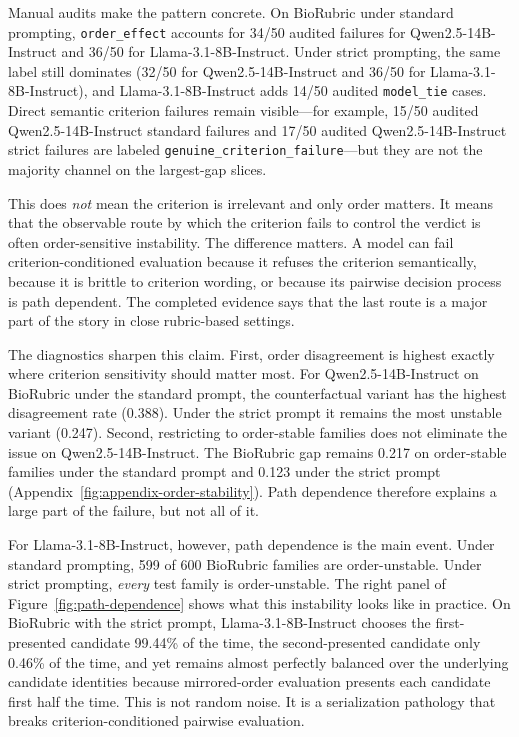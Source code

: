 \documentclass[11pt]{article}
\newcommand{\qwen}{Qwen2.5-14B-Instruct\xspace}
\newcommand{\llama}{Llama-3.1-8B-Instruct\xspace}
\newcommand{\biorubric}{BioRubric\xspace}
\begin{document}
Manual audits make the pattern concrete. On \biorubric under standard prompting, \texttt{order\_effect} accounts for 34/50 audited failures for \qwen and 36/50 for \llama. Under strict prompting, the same label still dominates (32/50 for \qwen and 36/50 for \llama), and \llama adds 14/50 audited \texttt{model\_tie} cases. Direct semantic criterion failures remain visible---for example, 15/50 audited \qwen standard failures and 17/50 audited \qwen strict failures are labeled \texttt{genuine\_criterion\_failure}---but they are not the majority channel on the largest-gap slices.

This does \emph{not} mean the criterion is irrelevant and only order matters. It means that the observable route by which the criterion fails to control the verdict is often order-sensitive instability. The difference matters. A model can fail criterion-conditioned evaluation because it refuses the criterion semantically, because it is brittle to criterion wording, or because its pairwise decision process is path dependent. The completed evidence says that the last route is a major part of the story in close rubric-based settings.

The diagnostics sharpen this claim. First, order disagreement is highest exactly where criterion sensitivity should matter most. For \qwen on \biorubric under the standard prompt, the counterfactual variant has the highest disagreement rate (0.388). Under the strict prompt it remains the most unstable variant (0.247). Second, restricting to order-stable families does not eliminate the issue on \qwen. The \biorubric gap remains 0.217 on order-stable families under the standard prompt and 0.123 under the strict prompt (Appendix~\ref{fig:appendix-order-stability}). Path dependence therefore explains a large part of the failure, but not all of it.

For \llama, however, path dependence is the main event. Under standard prompting, 599 of 600 \biorubric families are order-unstable. Under strict prompting, \emph{every} test family is order-unstable. The right panel of Figure~\ref{fig:path-dependence} shows what this instability looks like in practice. On \biorubric with the strict prompt, \llama chooses the first-presented candidate 99.44\% of the time, the second-presented candidate only 0.46\% of the time, and yet remains almost perfectly balanced over the underlying candidate identities because mirrored-order evaluation presents each candidate first half the time. This is not random noise. It is a serialization pathology that breaks criterion-conditioned pairwise evaluation.
\end{document}
